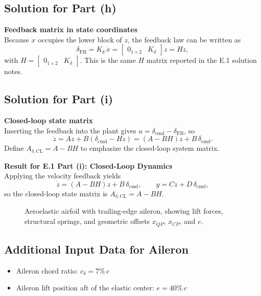 \documentclass[12pt]{article}
\begin{document}
\subsection*{Solution for Part (h)}

\begin{stepbox}
\textbf{Feedback matrix in state coordinates}\\[0.5em]
Because $\dot{x}$ occupies the lower block of $z$, the feedback law can be written as
\[
  \delta_{\text{FB}} = K_\delta\,\dot{x} = \begin{bmatrix} 0_{1\times 2} & K_\delta \end{bmatrix} z = H z,
\]
with $H = \begin{bmatrix} 0_{1\times 2} & K_\delta \end{bmatrix}$.  This is the same $H$ matrix reported in the E.1 solution notes.
\end{stepbox}

\subsection*{Solution for Part (i)}

\begin{stepbox}
\textbf{Closed-loop state matrix}\\[0.5em]
Inserting the feedback into the plant gives $u = \delta_{\text{cmd}} - \delta_{\text{FB}}$, so
\[
  \dot{z} = Az + B(\delta_{\text{cmd}} - H z) = (A - B H) z + B\,\delta_{\text{cmd}}.
\]
Define $A_{\delta,\text{CL}} = A - B H$ to emphasize the closed-loop system matrix.
\end{stepbox}

\begin{resultsbox}
\textbf{Result for E.1 Part (i): Closed-Loop Dynamics}\\[0.5em]
Applying the velocity feedback yields
\[
  \dot{z} = (A - B H) z + B\,\delta_{\text{cmd}}, \qquad
  y = C z + D\,\delta_{\text{cmd}},
\]
so the closed-loop state matrix is $A_{\delta,\text{CL}} = A - B H$.
\end{resultsbox}

\begin{figure}[htbp]
  \centering
  
  \caption{Aeroelastic airfoil with trailing-edge aileron, showing lift forces, structural springs, and geometric offsets $x_{QP}$, $x_{CP}$, and $e$.}
  \label{fig:aileron-placeholder}
\end{figure}

\subsection*{Additional Input Data for Aileron}
\begin{itemize}
  \item Aileron chord ratio: $c_\delta = 7\%\,c$
  \item Aileron lift position aft of the elastic center: $e = 40\%\,c$
\end{itemize}
\end{document}
